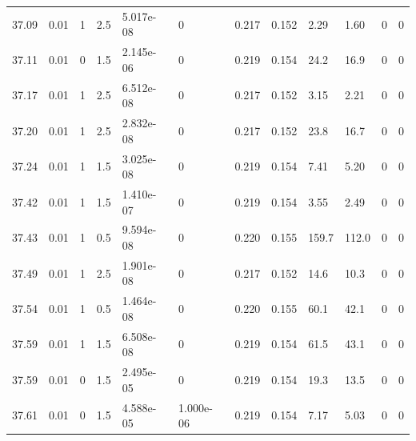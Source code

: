\documentclass[preview]{standalone}
\begin{document}
{{{{{{{{{{{{{{{{{\begin{tabular}{L{1.2cm}C{1.2cm} C{0.3cm}C{0.5cm} C{1.4cm}C{1.4cm} C{1.4cm}C{1.4cm} C{1.6cm}C{1.6cm} C{1.6cm}C{1.6cm}}
  37.09  &  0.01  & 1     & 2.5 &  5.017e-08  & 0  &  0.217&   0.152& 2.29 & 1.60   &  0 & 0  \\ 
  37.11  &  0.01  & 0     & 1.5 &  2.145e-06  & 0  &  0.219&   0.154& 24.2 & 16.9   &  0 & 0  \\ 
  37.17  &  0.01  & 1     & 2.5 &  6.512e-08  & 0  &  0.217&   0.152& 3.15 & 2.21   &  0 & 0  \\ 
  37.20  &  0.01  & 1     & 2.5 &  2.832e-08  & 0  &  0.217&   0.152& 23.8 & 16.7   &  0 & 0  \\ 
  37.24  &  0.01  & 1     & 1.5 &  3.025e-08  & 0  &  0.219&   0.154& 7.41 & 5.20   &  0 & 0  \\ 
  37.42  &  0.01  & 1     & 1.5 &  1.410e-07  & 0  &  0.219&   0.154& 3.55 & 2.49   &  0 & 0  \\ 
  37.43  &  0.01  & 1     & 0.5 &  9.594e-08  & 0  &  0.220&   0.155& 159.7 & 112.0   &  0 & 0  \\ 
  37.49  &  0.01  & 1     & 2.5 &  1.901e-08  & 0  &  0.217&   0.152& 14.6 & 10.3   &  0 & 0  \\ 
  37.54  &  0.01  & 1     & 0.5 &  1.464e-08  & 0  &  0.220&   0.155& 60.1 & 42.1   &  0 & 0  \\ 
  37.59  &  0.01  & 1     & 1.5 &  6.508e-08  & 0  &  0.219&   0.154& 61.5 & 43.1   &  0 & 0  \\ 
  37.59  &  0.01  & 0     & 1.5 &  2.495e-05  & 0  &  0.219&   0.154& 19.3 & 13.5   &  0 & 0  \\ 
  37.61  &  0.01  & 0     & 1.5 &  4.588e-05  & 1.000e-06  &  0.219&   0.154& 7.17 & 5.03   &  0 & 0  \\ 
\hline 
\end{tabular} 

}}}}}}}}}}}}}}}}}
\end{document}
